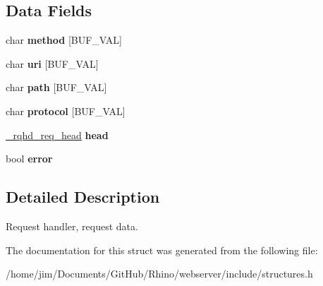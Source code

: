 \subsection*{Data Fields}
\begin{DoxyCompactItemize}
\item 
\hypertarget{struct__rqhd__req_a185edae62d9cb48cbe295194f1fb5983}{}char {\bfseries method} \mbox{[}B\+U\+F\+\_\+\+V\+A\+L\mbox{]}\label{struct__rqhd__req_a185edae62d9cb48cbe295194f1fb5983}

\item 
\hypertarget{struct__rqhd__req_aac2e28a7a9619316e495bdd26784c8b4}{}char {\bfseries uri} \mbox{[}B\+U\+F\+\_\+\+V\+A\+L\mbox{]}\label{struct__rqhd__req_aac2e28a7a9619316e495bdd26784c8b4}

\item 
\hypertarget{struct__rqhd__req_a1773c26caba4f8950d9c0fa079f0f63f}{}char {\bfseries path} \mbox{[}B\+U\+F\+\_\+\+V\+A\+L\mbox{]}\label{struct__rqhd__req_a1773c26caba4f8950d9c0fa079f0f63f}

\item 
\hypertarget{struct__rqhd__req_a907b7f03e190c20d7bbfcec7c0422d45}{}char {\bfseries protocol} \mbox{[}B\+U\+F\+\_\+\+V\+A\+L\mbox{]}\label{struct__rqhd__req_a907b7f03e190c20d7bbfcec7c0422d45}

\item 
\hypertarget{struct__rqhd__req_a251a5ca4b38705026711bccff3827afe}{}\hyperlink{struct__rqhd__req__head}{\+\_\+rqhd\+\_\+req\+\_\+head} {\bfseries head}\label{struct__rqhd__req_a251a5ca4b38705026711bccff3827afe}

\item 
\hypertarget{struct__rqhd__req_a01245ed1c86c65c1a5de9f942a132f5d}{}bool {\bfseries error}\label{struct__rqhd__req_a01245ed1c86c65c1a5de9f942a132f5d}

\end{DoxyCompactItemize}


\subsection{Detailed Description}
Request handler, request data. 

The documentation for this struct was generated from the following file\+:\begin{DoxyCompactItemize}
\item 
/home/jim/\+Documents/\+Git\+Hub/\+Rhino/webserver/include/structures.\+h\end{DoxyCompactItemize}
